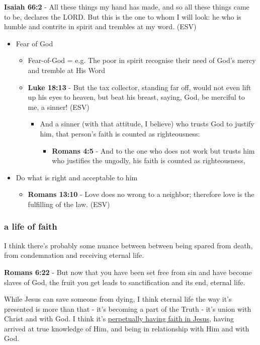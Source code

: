 \documentclass[11pt]{article}
\begin{document}
\textbf{Isaiah 66:2} - All these things my hand has made, and so all these things came to be, declares the LORD. But this is the one to whom I will look: he who is humble and contrite in spirit and trembles at my word. (ESV)

\begin{itemize}
\item Fear of God
\begin{itemize}
\item Fear-of-God = e.g. The poor in spirit recognise their need of God's mercy and tremble at His Word
\item \textbf{Luke 18:13} - But the tax collector, standing far off, would not even lift up his eyes to heaven, but beat his breast, saying, God, be merciful to me, a sinner! (ESV)
\begin{itemize}
\item And a sinner (with that attitude, I believe) who trusts God to justify him, that person's faith is counted as righteousness:
\begin{itemize}
\item \textbf{Romans 4:5} - And to the one who does not work but trusts him who justifies the ungodly, his faith is counted as righteousness,
\end{itemize}
\end{itemize}
\end{itemize}
\item Do what is right and acceptable to him
\begin{itemize}
\item \textbf{Romans 13:10} - Love does no wrong to a neighbor; therefore love is the fulfilling of the law. (ESV)
\end{itemize}
\end{itemize}

\subsubsection{a life of faith}
\label{sec:org9c8b5b4}
I think there's probably some nuance between between being spared from death, from condemnation and receiving eternal life.

\textbf{Romans 6:22} - But now that you have been set free from sin and have become slaves of God, the fruit you get leads to sanctification and its end, eternal life.

While Jesus can save someone from dying, I think eternal life the way it's presented is more than that - it's becoming a part of the Truth - it's union with Christ and with God.
I think it's \uline{perpetually having faith in Jesus}, having arrived at true knowledge of Him, and being in relationship with Him and with God.
\end{document}
